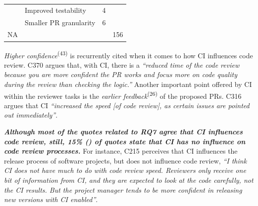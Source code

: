 \begin{table}
\begin{tabular}{p{11.0em}p{12.5em}cc}
			\cline{2-3}    \multicolumn{1}{c}{} & Improved testability & 4     &  \bigstrut\\
			\cline{2-3}    \multicolumn{1}{c}{} & Smaller PR granularity & 6     &  \bigstrut\\
			\hline
			{\centering NA}    &     &    & 156 \bigstrut\\
			\hline
		\end{tabular}%
		\label{tab:impact_of_CI_on_reviewing_process}%
	\end{table}%

	\textit{Higher confidence}\textsuperscript{(43)} is recurrently cited when it comes to how CI influences code review.  
	C370 argues that, with CI, there is a \textit{``reduced time of the code review because you are more confident the PR works and focus more on code quality during the review than checking the logic.''} Another important point offered by CI within the reviewer tasks is the \textit{earlier feedback}\textsuperscript{(26)} of the proposed PRs. 
	C316 argues that CI \textit{``increased the speed [of code review], as certain issues are pointed out immediately''}.

	\textit{\textbf{Although most of the quotes related to RQ7 agree that CI influences code review, still, 15\% () of quotes state that CI has no influence on code review processes.}} 
	For instance, C215 perceives that CI influences the release process of software projects, but does not influence code review, \textit{``I think CI does not have much to do with code review speed. Reviewers only receive one bit of information from CI, and they are expected to look at the code carefully, not the CI results. But the project manager tends to be more confident in releasing new versions with CI enabled''}.

